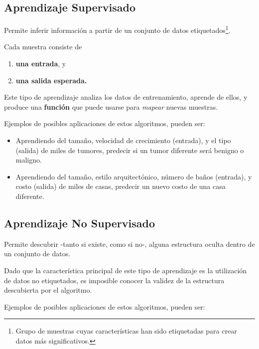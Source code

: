 \documentclass[twoside,twocolumn]{article}
\begin{document}
      \subsection{Aprendizaje Supervisado}
        Permite inferir información a partir de un conjunto de
        datos etiquetados\footnote{Grupo de muestras cuyas características
        han sido etiquetadas para crear datos más significativos.}.

        Cada muestra consiste de

        \begin{enumerate}[label=(\alph*)]
          \item \textbf{una entrada}, y
          \item \textbf{una salida esperada.}
        \end{enumerate}
        
        Este tipo de aprendizaje analiza los datos de entrenamiento,
        aprende de ellos, y produce una \textbf{función} que puede usarse
        para \textit{mapear} nuevas muestras.

        Ejemplos de posibles aplicaciones de estos algoritmos, pueden ser:

        \begin{itemize}
          \item Aprendiendo del tamaño, velocidad de crecimiento (entrada),
                y el tipo (salida) de miles de tumores, predecir si un
                tumor diferente será benigno o maligno.
          \item Aprendiendo del tamaño, estilo arquitectónico, 
                número de baños (entrada), y costo (salida)
                de miles de casas, predecir un nuevo costo de una casa diferente.
        \end{itemize}

      \subsection{Aprendizaje No Supervisado}
        Permite descubrir -tanto si existe, como si no-, alguna estructura
        oculta dentro de un conjunto de datos.

        Dado que la característica principal de este tipo de aprendizaje
        es la utilización de datos no etiquetados, es imposible conocer
        la validez de la estructura descubierta por el algoritmo.

        Ejemplos de posibles aplicaciones de estos algoritmos, pueden ser:
        
\end{document}
